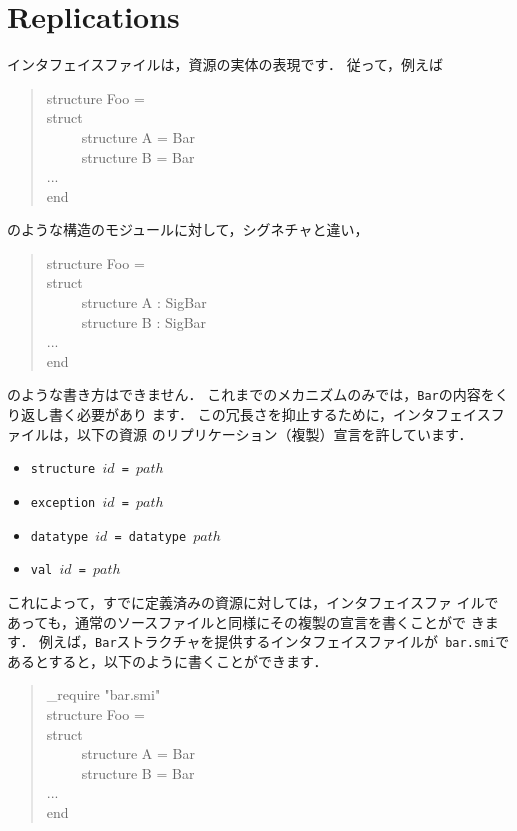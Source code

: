 \documentclass{jbook}
\newcommand{\txt}[2]{#2}
\newenvironment{program}{\begin{tt}\begin{quote}}{\end{quote}\end{tt}}
\newcommand{\myem}{\ \ \ \ \  }
\begin{document}
\section{\txt{リプリケーション宣言}{Replications}}
\label{sec:tutorialReplicationInInterface}

\ifx\jp%
	インタフェイスファイルは，資源の実体の表現です．
	従って，例えば
\begin{program}
structure Foo = \\
struct\\
\myem structure A = Bar\\
\myem structure B = Bar\\
...\\
end

\end{program}
のような構造のモジュールに対して，シグネチャと違い，
\begin{program}
structure Foo = \\
struct\\
\myem structure A : SigBar\\
\myem structure B : SigBar\\
...\\
end
\end{program}
のような書き方はできません．
	これまでのメカニズムのみでは，{\tt Bar}の内容をくり返し書く必要があり
ます．
	この冗長さを抑止するために，インタフェイスファイルは，以下の資源
のリプリケーション（複製）宣言を許しています．
\begin{itemize}
\item {\tt structure $id$ =  $path$}
\item {\tt exception $id$ = $path$}
\item {\tt datatype $id$ = datatype $path$}
\item {\tt val $id$ = $path$}
\end{itemize}
	これによって，すでに定義済みの資源に対しては，インタフェイスファ
イルであっても，通常のソースファイルと同様にその複製の宣言を書くことがで
きます．
	例えば，{\tt Bar}ストラクチャを提供するインタフェイスファイルが{\tt
bar.smi}であるとすると，以下のように書くことができます．
\begin{program}
\_require "bar.smi"\\
structure Foo = \\
struct\\
\myem structure A = Bar\\
\myem structure B = Bar\\
...\\
end
\end{program}
\end{document}
